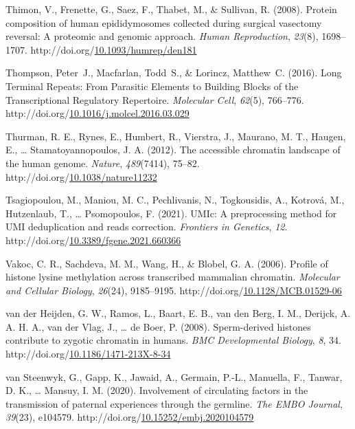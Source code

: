 \documentclass[12pt,twoside]{reedthesis}
\newlength{\cslhangindent}
\newenvironment{CSLReferences}[2] %
 {%
  \setlength{\parindent}{0pt}
  \ifodd #1 \everypar{\setlength{\hangindent}{\cslhangindent}}\ignorespaces\fi
  \ifnum #2 > 0
  \setlength{\parskip}{#2\baselineskip}
  \fi
 }%
 {}
\begin{document}
\begin{CSLReferences}{1}{0}
\leavevmode{}%
Thimon, V., Frenette, G., Saez, F., Thabet, M., \& Sullivan, R. (2008). Protein composition of human epididymosomes collected during surgical vasectomy reversal: A proteomic and genomic approach. \emph{Human Reproduction}, \emph{23}(8), 1698--1707. http://doi.org/\href{https://doi.org/10.1093/humrep/den181}{10.1093/humrep/den181}

\leavevmode{}%
Thompson, Peter~J., Macfarlan, Todd~S., \& Lorincz, Matthew~C. (2016). Long Terminal Repeats: From Parasitic Elements to Building Blocks of the Transcriptional Regulatory Repertoire. \emph{Molecular Cell}, \emph{62}(5), 766--776. http://doi.org/\href{https://doi.org/10.1016/j.molcel.2016.03.029}{10.1016/j.molcel.2016.03.029}

\leavevmode{}%
Thurman, R. E., Rynes, E., Humbert, R., Vierstra, J., Maurano, M. T., Haugen, E., \ldots{} Stamatoyannopoulos, J. A. (2012). The accessible chromatin landscape of the human genome. \emph{Nature}, \emph{489}(7414), 75--82. http://doi.org/\href{https://doi.org/10.1038/nature11232}{10.1038/nature11232}

\leavevmode{}%
Tsagiopoulou, M., Maniou, M. C., Pechlivanis, N., Togkousidis, A., Kotrová, M., Hutzenlaub, T., \ldots{} Psomopoulos, F. (2021). UMIc: A preprocessing method for UMI deduplication and reads correction. \emph{Frontiers in Genetics}, \emph{12}. http://doi.org/\href{https://doi.org/10.3389/fgene.2021.660366}{10.3389/fgene.2021.660366}

\leavevmode{}%
Vakoc, C. R., Sachdeva, M. M., Wang, H., \& Blobel, G. A. (2006). Profile of histone lysine methylation across transcribed mammalian chromatin. \emph{Molecular and Cellular Biology}, \emph{26}(24), 9185--9195. http://doi.org/\href{https://doi.org/10.1128/MCB.01529-06}{10.1128/MCB.01529-06}

\leavevmode{}%
van der Heijden, G. W., Ramos, L., Baart, E. B., van den Berg, I. M., Derijck, A. A. H. A., van der Vlag, J., \ldots{} de Boer, P. (2008). Sperm-derived histones contribute to zygotic chromatin in humans. \emph{BMC Developmental Biology}, \emph{8}, 34. http://doi.org/\href{https://doi.org/10.1186/1471-213X-8-34}{10.1186/1471-213X-8-34}

\leavevmode{}%
van Steenwyk, G., Gapp, K., Jawaid, A., Germain, P.-L., Manuella, F., Tanwar, D. K., \ldots{} Mansuy, I. M. (2020). Involvement of circulating factors in the transmission of paternal experiences through the germline. \emph{The EMBO Journal}, \emph{39}(23), e104579. http://doi.org/\href{https://doi.org/10.15252/embj.2020104579}{10.15252/embj.2020104579}


\end{CSLReferences}
\end{document}
